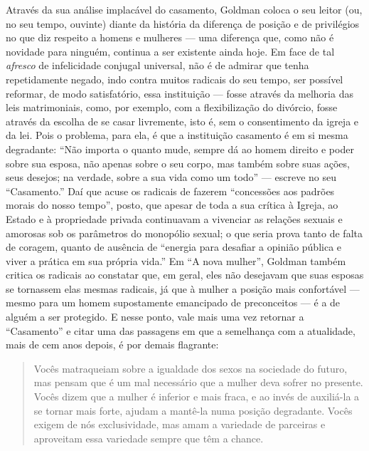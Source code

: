 Através da sua análise implacável do casamento, Goldman coloca o seu
leitor (ou, no seu tempo, ouvinte) diante da história da diferença de
posição e de privilégios no que diz respeito a homens e mulheres ---
uma diferença que, como não é novidade para ninguém, continua a ser
existente ainda hoje. Em face de tal \textit{afresco} de infelicidade
conjugal universal, não é de admirar que tenha repetidamente negado,
indo contra muitos radicais do seu tempo, ser possível reformar, de modo
satisfatório, essa instituição --- fosse através da melhoria das leis
matrimoniais, como, por exemplo, com a flexibilização do divórcio, fosse
através da escolha de se casar livremente, isto é, sem o consentimento
da igreja e da lei. Pois o problema, para ela, é que a instituição
casamento é em si mesma degradante: ``Não importa o quanto mude, sempre
dá ao homem direito e poder sobre sua esposa, não apenas sobre o seu
corpo, mas também sobre suas ações, seus desejos; na verdade, sobre a
sua vida como um todo'' --- escreve no seu ``Casamento.'' Daí que acuse
os radicais de fazerem ``concessões aos padrões morais do nosso tempo'',
posto, que apesar de toda a sua crítica à Igreja, ao Estado e à
propriedade privada continuavam a vivenciar as relações sexuais e
amorosas sob os parâmetros do monopólio sexual; o que seria prova tanto
de falta de coragem, quanto de ausência de ``energia para desafiar a
opinião pública e viver a prática em sua própria vida.'' Em ``A nova
mulher'', Goldman também critica os radicais ao constatar que, em geral,
eles não desejavam que suas esposas se tornassem elas mesmas radicais,
já que à mulher a posição mais confortável --- mesmo para um homem
supostamente emancipado de preconceitos --- é a de alguém a ser
protegido. E nesse ponto, vale mais uma vez retornar a ``Casamento'' e
citar uma das passagens em que a semelhança com a atualidade, mais de
cem anos depois, é por demais flagrante:

\begin{quote}
Vocês matraqueiam sobre a igualdade dos sexos na sociedade do futuro,
mas pensam que é um mal necessário que a mulher deva sofrer no presente.
Vocês dizem que a mulher é inferior e mais fraca, e ao invés de
auxiliá-la a se tornar mais forte, ajudam a mantê-la numa posição
degradante. Vocês exigem de nós exclusividade, mas amam a variedade de
parceiras e aproveitam essa variedade sempre que têm a chance.
\end{quote}

